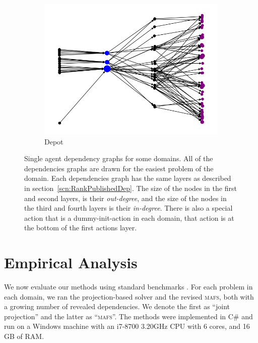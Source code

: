 \documentclass{article}
\newcommand{\mafs}{\textsc {mafs}\xspace}
\newcommand{\commentout}[1]{}
\theoremstyle{remark}
\begin{document}
\begin{figure}[t!]
\begin{subfigure}[b]{0.23\textwidth}
\centering
  \includegraphics[width=1\linewidth]{Dependencies_graphs/DepGraphDepot}
  \caption{Depot}
  \label{fig:DepGraphDepot}
\end{subfigure}\hspace{1em}
\caption{Single agent dependency graphs for some domains. All of the dependencies graphs are drawn for the easiest problem of the domain. Each dependencies graph has the same layers as described in section~\ref{scn:RankPublishedDep}. The size of the nodes in the first and second layers, is their \emph{out-degree}, and the size of the nodes in the third and fourth layers is their \emph{in-degree}. There is also a special action that is a dummy-init-action in each domain, that action is at the bottom of the first actions layer.\commentout{ The dummy-init-action does not appear in Logistics and ZenoTravel, because it does not have any dependency with another public action in these domains.}}
\vspace{-0.3cm}
\label{fig:DependenciesGraphs}
\end{figure}

   
\section{Empirical Analysis}

We now evaluate our methods using standard benchmarks \cite{vstolba2015competition}. For each problem in each domain, we ran the projection-based solver \cite{maliah2016projections} and the revised \mafs, both with a growing number of revealed dependencies. We denote the first as ``joint projection'' and the latter as ``\mafs''. The methods were implemented in C\# and run on a Windows machine with an i7-8700 3.20GHz CPU with 6 cores, and 16 GB of RAM.
\end{document}
